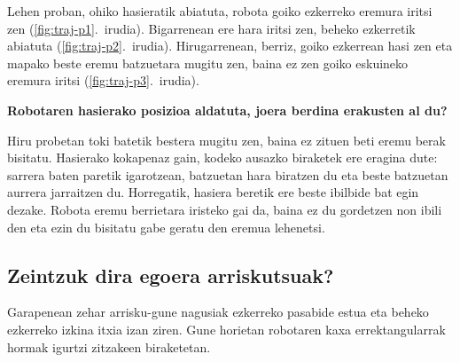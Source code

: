 \clearpage
Lehen proban, ohiko hasieratik abiatuta, robota goiko ezkerreko eremura iritsi zen (\ref{fig:traj-p1}.~irudia). Bigarrenean ere hara iritsi zen, beheko ezkerretik abiatuta (\ref{fig:traj-p2}.~irudia). Hirugarrenean, berriz, goiko ezkerrean hasi zen eta mapako beste eremu batzuetara mugitu zen, baina ez zen goiko eskuineko eremura iritsi (\ref{fig:traj-p3}.~irudia).

\textbf{Robotaren hasierako posizioa aldatuta, joera berdina erakusten al du?}

Hiru probetan toki batetik bestera mugitu zen, baina ez zituen beti eremu berak bisitatu. Hasierako kokapenaz gain, kodeko ausazko biraketek ere eragina dute: sarrera baten paretik igarotzean, batzuetan hara biratzen du eta beste batzuetan aurrera jarraitzen du. Horregatik, hasiera beretik ere beste ibilbide bat egin dezake. Robota eremu berrietara iristeko gai da, baina ez du gordetzen non ibili den eta ezin du bisitatu gabe geratu den eremua lehenetsi.

\subsection{Zeintzuk dira egoera arriskutsuak?}\label{sec:oz-arriskuak}

Garapenean zehar arrisku-gune nagusiak ezkerreko pasabide estua eta beheko ezkerreko izkina itxia izan ziren. Gune horietan robotaren kaxa errektangularrak hormak igurtzi zitzakeen biraketetan.
